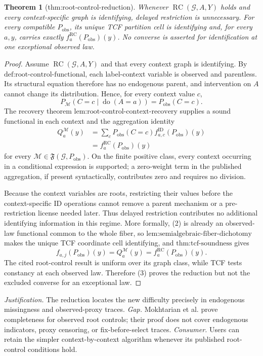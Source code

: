\documentclass{article}
\newtheorem{theorem}{Theorem}
\begin{document}
\begin{theorem}[thm:root-control-reduction]\label{thm:root-control-reduction}
Whenever \(\operatorname{RC}(\mathcal G,A,Y)\) holds and every context-specific graph is identifying, delayed restriction is unnecessary. For every compatible \(P_{\mathrm{obs}}\), its unique TCF partition cell is identifying and, for every \(a,y\), carries exactly \(f_a^{\mathrm{RC}}(P_{\mathrm{obs}})(y)\). No converse is asserted for identification at one exceptional observed law.
\end{theorem}
\begin{proof}
Assume \(\operatorname{RC}(\mathcal G,A,Y)\) and that every context graph is identifying.  By \(\text{def:root-control-functional}\), each label-context variable is observed and parentless.  Its structural equation therefore has no endogenous parent, and intervention on \(A\) cannot change its distribution.  Hence, for every context value \(c\),
\[
P_{\mathcal M}(C=c\mid\operatorname{do}(A=a))
=P_{\mathrm{obs}}(C=c).
\tag{1}
\]
The recovery theorem \(\text{lem:root-control-context-recovery}\) supplies a sound functional in each context and the aggregation identity
\[
\begin{aligned}
Q_a^{\mathcal M}(y)
&=\sum_cP_{\mathrm{obs}}(C=c)
f^{\mathrm{ID}}_{a,c}(P_{\mathrm{obs}})(y)\\
&=f_a^{\mathrm{RC}}(P_{\mathrm{obs}})(y)
\end{aligned}
\tag{2}
\]
for every \(\mathcal M\in\mathfrak F(\mathcal G,P_{\mathrm{obs}})\).  On the finite positive class, every context occurring in a conditional expression is supported; a zero-weight term in the published aggregation, if present syntactically, contributes zero and requires no division.

Because the context variables are roots, restricting their values before the context-specific ID operations cannot remove a parent mechanism or a pre-restriction license needed later.  Thus delayed restriction contributes no additional identifying information in this regime.  More formally, (2) is already an observed-law functional common to the whole fiber, so \(\text{lem:semialgebraic-fiber-dichotomy}\) makes the unique TCF coordinate cell identifying, and \(\text{thm:tcf-soundness}\) gives
\[
f_{a,j}(P_{\mathrm{obs}})(y)
=Q_a^{\mathcal M}(y)
=f_a^{\mathrm{RC}}(P_{\mathrm{obs}})(y).
\tag{3}
\]
The cited root-control result is uniform over its graph class, while TCF tests constancy at each observed law.  Therefore (3) proves the reduction but not the excluded converse for an exceptional law.
\end{proof}
\par\smallskip\noindent \textit{Justification.} The reduction locates the new difficulty precisely in endogenous missingness and observed-proxy traces. \textit{Gap.} Mokhtarian et al. prove completeness for observed root controls; their proof does not cover endogenous indicators, proxy censoring, or fix-before-select traces. \textit{Consumer.} Users can retain the simpler context-by-context algorithm whenever its published root-control conditions hold.
\end{document}
